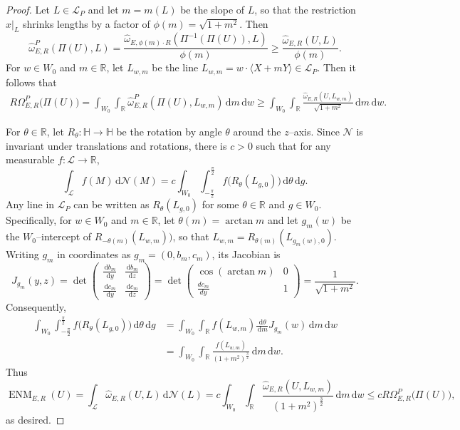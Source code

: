 \documentclass[11pt,reqno]{amsart}
\newcommand{\wwidehat}[1]{\widehat{#1}}
\renewcommand{\H}{\mathbb{H}}
\newcommand{\R}{\mathbb{R}}
\newcommand{\cL}{\mathcal{L}}
\newcommand{\cN}{\mathcal{N}}
\newcommand{\ud}[0]{\,\mathrm{d}}
\newcommand{\0}{\mathbf{0}}
\renewcommand{\1}{\mathbf 1}
\newcommand{\from}{\colon}
\renewcommand{\ge}{\geqslant}
\renewcommand{\le}{\leqslant}
\theoremstyle{remark}
\DeclareMathOperator{\ENM}{ENM}
\begin{document}
\begin{proof}
  Let $L\in \cL_P$ and let $m=m(L)$ be the slope of $L$, so that the restriction $x|_L$ shrinks lengths by a factor of $\phi(m)=\sqrt{1+m^2}$.  Then
  $$\wwidehat{\omega}^P_{E,R}(\Pi(U),L)=\frac{\wwidehat{\omega}_{E ,\phi(m) \cdot R}(\Pi^{-1}(\Pi(U)),L)}{\phi(m)}\ge \frac{\wwidehat{\omega}_{E,R}(U,L)}{\phi(m)}.$$
 For $w\in W_0$ and $m\in \R$, let $L_{w,m}$ be the line $L_{w,m}=w\cdot \langle X+mY\rangle\in \cL_P$.  Then it follows that
  \begin{align*}
    R \Omega^P_{E,R}\big(\Pi(U)\big)
    =\int_{W_0}\int_\R \wwidehat{\omega}^P_{E,R}(\Pi(U), L_{w,m}) \ud m \ud w
    \ge \int_{W_0}\int_\R \frac{\wwidehat{\omega}_{E,R}(U, L_{w,m})}{\sqrt{1+m^2}} \ud m \ud w.
  \end{align*}

  For $\theta\in \R$, let $R_\theta\from \H\to \H$ be the rotation by angle $\theta$ around the $z$--axis. Since $\cN$ is invariant under translations and rotations, there is $c>0$ such that for any measurable $f\from \cL\to \R$,
  $$\int_{\cL} f(M) \ud \cN(M) = c\int_{W_0} \int_{-\frac{\pi}{2}}^{\frac{\pi}{2}} f\big(R_{\theta}(L_{g,0})\big) \ud \theta \ud g.$$
Any line in $\cL_P$ can be written as $R_\theta(L_{g,0})$ for some $\theta\in \R$ and $g\in W_0$.  Specifically, for $w\in W_0$ and $m\in \R$, let $\theta(m)=\arctan m$ and let $g_m(w)$ be the $W_0$--intercept of $R_{-\theta(m)}(L_{w,m}))$, so that $L_{w,m}=R_{\theta(m)}(L_{g_m(w),0})$.
  Writing $g_m$ in coordinates as $g_m=(0, b_m,c_m)$, its Jacobian is
  $$J_{g_m}(y, z) = \det\begin{pmatrix}
    \frac{\ud  b_m}{\ud  y} & \frac{\ud  b_m}{\ud  z} \\
    \frac{\ud  c_m}{\ud  y} & \frac{\ud  c_m}{\ud  z}
  \end{pmatrix} = \det\begin{pmatrix}
    \cos(\arctan m)& 0 \\
    \frac{d c_m} {d y} & 1
  \end{pmatrix} = \frac{1}{\sqrt{1+m^2}}.$$
Consequently,
  \begin{align*}\int_{W_0} \int_{-\frac{\pi}{2}}^{\frac{\pi}{2}} f\big(R_{\theta}(L_{g,0})\big) \ud \theta \ud g &= \int_{W_0} \int_\R f(L_{w,m}) \frac{\ud \theta}{\ud  m} J_{g_m}(w) \ud m \ud w\\& = \int_{W_0} \int_\R \frac{f(L_{w,m})}{(1+m^2)^{\frac{3}{2}}} \ud m \ud w.\end{align*}
Thus
  \begin{equation*}
    \ENM_{E,R}(U)
    = \int_{\cL} \wwidehat{\omega}_{E,R}(U, L) \ud\cN(L)
    = c \int_{W_0} \int_\R \frac{\wwidehat{\omega}_{E,R}(U, L_{w,m})}{(1+m^2)^{\frac{3}{2}}} \ud m \ud w
    \le c R \Omega^P_{E,R}\big(\Pi(U)\big),
  \end{equation*}
  as desired.
\end{proof}
\end{document}
